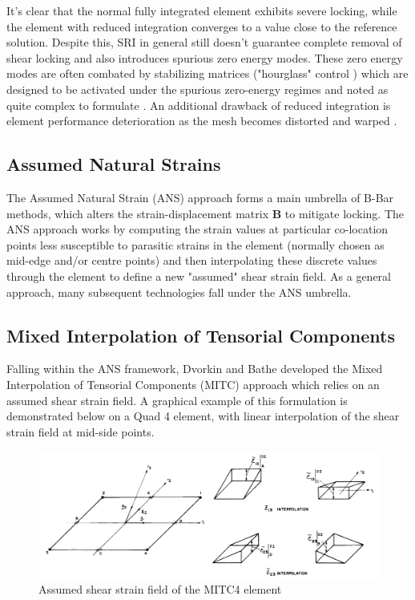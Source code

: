 It's clear that the normal fully integrated element exhibits severe locking, while the element with reduced integration converges to a value close to the reference solution. Despite this, SRI in general still doesn't guarantee complete removal of shear locking and also introduces spurious zero energy modes. These zero energy modes are often combated by stabilizing matrices ("hourglass" control \cite{Zien2Vol2000}) which are designed to be activated under the spurious zero-energy regimes and noted as quite complex to formulate \cite{Mohan97}. An additional drawback of reduced integration is element performance deterioration as the mesh becomes distorted and warped \cite{Nguyen2009} \cite{Yang2000}.

\subsection{Assumed Natural Strains}

The Assumed Natural Strain (ANS) approach forms a main umbrella of B-Bar methods, which alters the strain-displacement matrix $\mathbf{B}$ to mitigate locking. The ANS approach \cite{MACNEAL1982} works by computing the strain values at particular co-location points less susceptible to parasitic strains in the element (normally chosen as mid-edge and/or centre points) and then interpolating these discrete values through the element to define a new "assumed" shear strain field. As a general approach, many subsequent technologies fall under the ANS umbrella.

\subsection{Mixed Interpolation of Tensorial Components}

Falling within the ANS framework, Dvorkin and Bathe \cite{Dvorkin84} \cite{Bathe86} developed the Mixed Interpolation of Tensorial Components (MITC) approach which relies on an assumed shear strain field. A graphical example of this formulation is demonstrated below on a Quad 4 element, with linear interpolation of the shear strain field at mid-side points.

\begin{figure}[H]
	\centering
	\def\svgwidth{\columnwidth}
	\includegraphics[width=16cm]{images/mitc4.png}
	\caption{Assumed shear strain field of the MITC4 element \cite{Bathe86}}
	\label{ansexample}
\end{figure}

